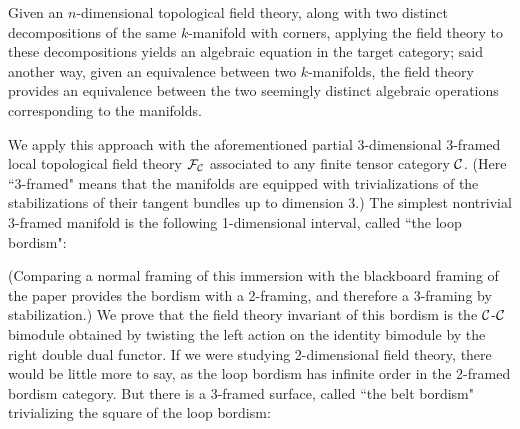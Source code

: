 \documentclass{amsart}
\begin{document}
Given an $n$-dimensional topological field theory, along with two distinct decompositions of the same $k$-manifold with corners, applying the field theory to these decompositions yields an algebraic equation in the target category; said another way, given an equivalence between two $k$-manifolds, the field theory provides an equivalence between the two seemingly distinct algebraic operations corresponding to the manifolds.

We apply this approach with the aforementioned partial 3-dimensional 3-framed local topological field theory $\mathcal F_\mathcal C$ associated to any finite tensor category $\mathcal C$.  (Here ``3-framed" means that the manifolds are equipped with trivializations of the stabilizations of their tangent bundles up to dimension 3.)  The simplest nontrivial 3-framed manifold is the following 1-dimensional interval, called ``the loop bordism":
\begin{center}
\end{center}
(Comparing a normal framing of this immersion with the blackboard framing of the paper provides the bordism with a 2-framing, and therefore a 3-framing by stabilization.)  We prove that the field theory invariant of this bordism is the $\mathcal C$-$\mathcal C$ bimodule obtained by twisting the left action on the identity bimodule by the right double dual functor.  If we were studying 2-dimensional field theory, there would be little more to say, as the loop bordism has infinite order in the 2-framed bordism category.  But there is a 3-framed surface, called ``the belt bordism" trivializing the square of the loop bordism: 
\end{document}
